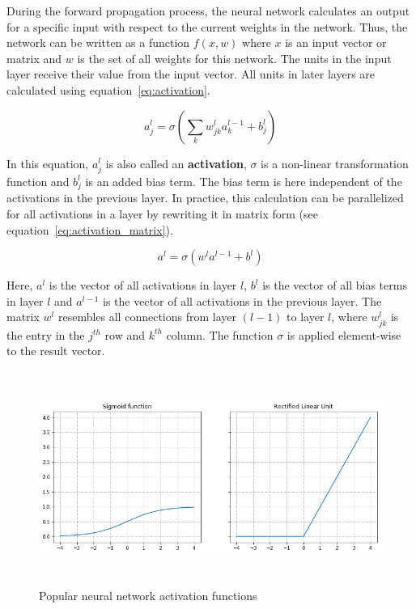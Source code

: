 During the forward propagation process, the neural network calculates an output
for a specific input with respect to the current weights in the network.
Thus, the network can be written as a function $f(x,w)$ where $x$ is an input
vector or matrix and $w$ is the set of all weights for this network.
The units in the input layer receive their value from the input vector.
All units in later layers are calculated using equation~\ref{eq:activation}.

\begin{equation}
  \label{eq:activation}
  a_j^l = \sigma(\sum_k w_{jk}^l a_k^{l-1} + b_j^l)
\end{equation}

In this equation, $a_j^l$ is also called an \textbf{activation}, $\sigma$ is a
non-linear transformation function and $b_j^l$ is an added bias term.
The bias term is here independent of the activations in the previous layer.
In practice, this calculation can be parallelized for all activations in a layer
by rewriting it in matrix form (see equation~\ref{eq:activation_matrix}).

\begin{equation}
  \label{eq:activation_matrix}
  a^l = \sigma(w^l a^{l-1} + b^l)
\end{equation}

Here, $a^l$ is the vector of all activations in layer $l$, $b^l$ is the vector
of all bias terms in layer $l$ and $a^{l-1}$ is the vector of all activations
in the previous layer. The matrix $w^l$ resembles all connections from layer $(l-1)$
to layer $l$, where $w^l_{jk}$ is the entry in the $j^{th}$ row and $k^{th}$ column.
The function $\sigma$ is applied element-wise to the result vector.

\begin{figure}[h]
  \centering
  \includegraphics[height=7cm]{img/nn_activations}
  \caption{Popular neural network activation functions}
\label{fig:activations}
\end{figure}

